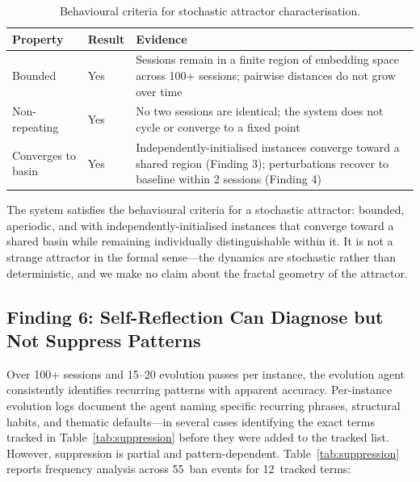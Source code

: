 \documentclass{article}
\begin{document}
\begin{table}[h]
\centering
\caption{Behavioural criteria for stochastic attractor characterisation.}
\label{tab:dynamics}
\begin{tabular}{llp{5.5cm}}
\toprule
\textbf{Property} & \textbf{Result} & \textbf{Evidence} \\
\midrule
Bounded                     & Yes & Sessions remain in a finite region of embedding space across 100+ sessions; pairwise distances do not grow over time \\
Non-repeating               & Yes & No two sessions are identical; the system does not cycle or converge to a fixed point \\
Converges to basin          & Yes & Independently-initialised instances converge toward a shared region (Finding 3); perturbations recover to baseline within 2 sessions (Finding 4) \\
\bottomrule
\end{tabular}
\end{table}

The system satisfies the behavioural criteria for a stochastic attractor:
bounded, aperiodic, and with independently-initialised instances that converge
toward a shared basin while remaining individually distinguishable within it.
It is not a strange attractor in the formal sense---the dynamics are
stochastic rather than deterministic, and we make no claim about the
fractal geometry of the attractor.

\subsection{Finding 6: Self-Reflection Can Diagnose but Not Suppress Patterns}

Over 100+ sessions and 15--20 evolution passes per instance, the evolution
agent consistently identifies recurring patterns with apparent accuracy. Per-instance
evolution logs document the agent naming specific recurring phrases, structural
habits, and thematic defaults---in several cases identifying the exact terms
tracked in Table~\ref{tab:suppression} before they were added to the tracked list. However, suppression is partial and
pattern-dependent. Table~\ref{tab:suppression} reports frequency analysis
across 55~ban events for 12~tracked terms:
\end{document}
